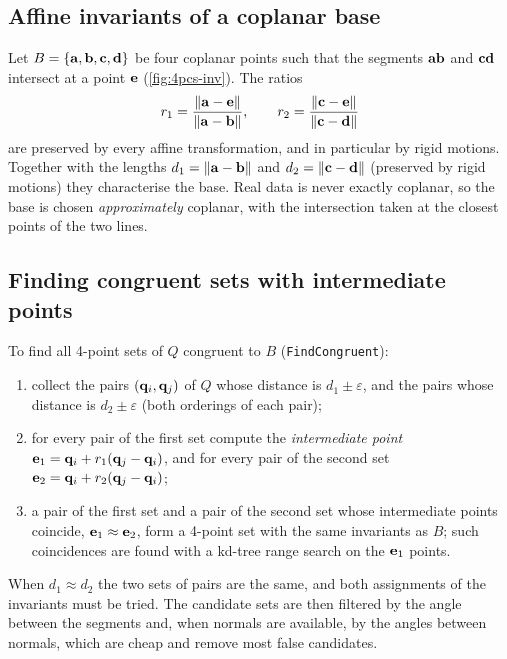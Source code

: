 \subsection{Affine invariants of a coplanar base}

Let $B=\{\mathbf{a},\mathbf{b},\mathbf{c},\mathbf{d}\}$ be four coplanar points such that the segments $\mathbf{a}\mathbf{b}$ and $\mathbf{c}\mathbf{d}$
intersect at a point $\mathbf{e}$ (\cref{fig:4pcs-inv}). The ratios
\begin{equation}
r_1=\frac{\left\lVert \mathbf{a}-\mathbf{e}\right\rVert}{\left\lVert \mathbf{a}-\mathbf{b}\right\rVert},\qquad r_2=\frac{\left\lVert \mathbf{c}-\mathbf{e}\right\rVert}{\left\lVert \mathbf{c}-\mathbf{d}\right\rVert}
\end{equation}
are preserved by every affine transformation, and in particular by rigid motions. Together with the
lengths $d_1=\left\lVert \mathbf{a}-\mathbf{b}\right\rVert$ and $d_2=\left\lVert \mathbf{c}-\mathbf{d}\right\rVert$ (preserved by rigid motions) they
characterise the base. Real data is never exactly coplanar, so the base is chosen
\emph{approximately} coplanar, with the intersection taken at the closest points of the two
lines.

\subsection{Finding congruent sets with intermediate points}

To find all 4-point sets of $Q$ congruent to $B$ (\texttt{FindCongruent}):
\begin{enumerate}
  \item collect the pairs $(\mathbf{q}_i,\mathbf{q}_j)$ of $Q$ whose distance is $d_1\pm\varepsilon$, and the pairs
  whose distance is $d_2\pm\varepsilon$ (both orderings of each pair);
  \item for every pair of the first set compute the \emph{intermediate point}
  $\mathbf{e}_1=\mathbf{q}_i+r_1(\mathbf{q}_j-\mathbf{q}_i)$, and for every pair of the second set
  $\mathbf{e}_2=\mathbf{q}_i+r_2(\mathbf{q}_j-\mathbf{q}_i)$;
  \item a pair of the first set and a pair of the second set whose intermediate points coincide,
  $\mathbf{e}_1\approx\mathbf{e}_2$, form a 4-point set with the same invariants as $B$; such coincidences are
  found with a kd-tree range search on the $\mathbf{e}_1$ points.
\end{enumerate}
When $d_1\approx d_2$ the two sets of pairs are the same, and both assignments of the invariants
must be tried. The candidate sets are then filtered by the angle between the segments and,
when normals are available, by the angles between normals, which are cheap and remove most false
candidates.


